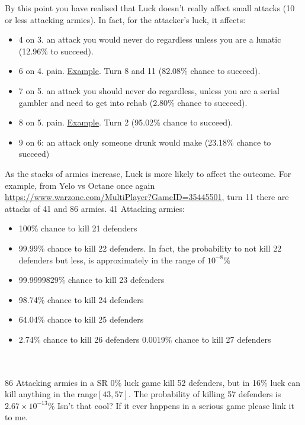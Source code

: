 By this point you have realised that Luck doesn't really affect small attacks (10 or less attacking armies). In fact, for the attacker's luck, it affects:
\begin{itemize}
    \item 4 on 3. an attack you would never do regardless unless you are a lunatic (12.96\% to succeed).
    \item 6 on 4. pain. \href{https://www.warzone.com/MultiPlayer?GameID=36624250}{Example}. Turn 8 and 11 (82.08\% chance to succeed).
    \item 7 on 5. an attack you should never do regardless, unless you are a serial gambler and need to get into rehab (2.80\% chance to succeed).
    \item 8 on 5. pain. \href{https://www.warzone.com/MultiPlayer?GameID=36022109}{Example}. Turn 2 (95.02\% chance to succeed).
    \item 9 on 6: an attack only someone drunk would make (23.18\% chance to succeed)
\end{itemize}

As the stacks of armies increase, Luck is more likely to affect the outcome. For example, from Yelo vs Octane once again \url{https://www.warzone.com/MultiPlayer?GameID=35445501}, turn 11 there are attacks of 41 and 86 armies. 
41 Attacking armies:
\begin{itemize}
    \item 100\% chance to kill 21 defenders
    \item 99.99\% chance to kill 22 defenders. In fact, the probability to not kill 22 defenders but less, is approximately in the range of $10^{-8}\%$
    \item 99.9999829\% chance to kill 23 defenders
    \item 98.74\% chance to kill 24 defenders
    \item 64.04\% chance to kill 25 defenders
    \item 2.74\% chance to kill 26 defenders
    0.0019\% chance to kill 27 defenders
\end{itemize}
\\
\\
86 Attacking armies in a SR 0\% luck game kill 52 defenders, but in 16\% luck can kill anything in the range$[43,57]$. The probability of killing 57 defenders is $2.67 \times 10^{-13}\%$ Isn't that cool? If it ever happens in a serious game please link it to me.